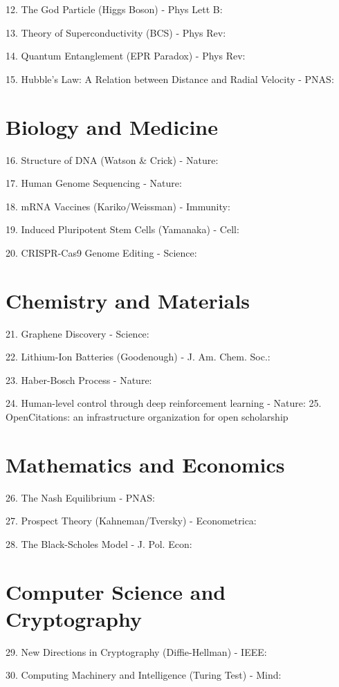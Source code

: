 \documentclass[12pt]{article}
\begin{document}
12. The God Particle (Higgs Boson) - Phys Lett B: \cite{Aad2012observatio}

13. Theory of Superconductivity (BCS) - Phys Rev: \cite{Bardeen1957theoryofsu}

14. Quantum Entanglement (EPR Paradox) - Phys Rev: \cite{Einstein1935canquantum}

15. Hubble's Law: A Relation between Distance and Radial Velocity - PNAS: \cite{Hubble1929arelationb}

\section{Biology and Medicine}
16. Structure of DNA (Watson & Crick) - Nature: \cite{WATSON1953moleculars}

17. Human Genome Sequencing - Nature: \cite{Hopfner2002therad50zi}

18. mRNA Vaccines (Kariko/Weissman) - Immunity: \cite{Karikó2005suppressio}

19. Induced Pluripotent Stem Cells (Yamanaka) - Cell: \cite{Takahashi2006inductiono}

20. CRISPR-Cas9 Genome Editing - Science: \cite{Jinek2012aprogramma}

\section{Chemistry and Materials}
21. Graphene Discovery - Science: \cite{Novoselov2004electricfi}

22. Lithium-Ion Batteries (Goodenough) - J. Am. Chem. Soc.: \cite{Chamberlain1983arylisomer}

23. Haber-Bosch Process - Nature: \cite{ENGELBRETH-HOLM1950production}


24. Human-level control through deep reinforcement learning - Nature:
\cite{Mnih2015humanlevel}
25. OpenCitations: an infrastructure organization for open scholarship  
\cite{Peroni2020opencitati}

\section{Mathematics and Economics}
26. The Nash Equilibrium - PNAS: \cite{Nash1950equilibriu}

27. Prospect Theory (Kahneman/Tversky) - Econometrica: \cite{Kahneman1979prospectth}

28. The Black-Scholes Model - J. Pol. Econ: \cite{Black1973thepricing}

\section{Computer Science and Cryptography}
29. New Directions in Cryptography (Diffie-Hellman) - IEEE: \cite{Diffie1976newdirecti}

30. Computing Machinery and Intelligence (Turing Test) - Mind: \cite{TURING1950icomputing}
\end{document}
